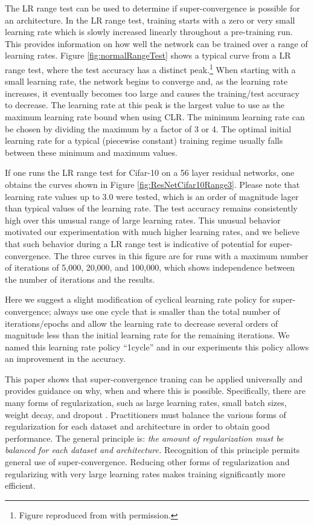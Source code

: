 \documentclass{article}
\begin{document}
The LR range test  can be used to determine if super-convergence is possible for an architecture.
In the LR range test, training starts with a zero or very small learning rate which is slowly increased linearly throughout a  pre-training run.  
This provides information on how well the network can be trained over a range of learning rates.
Figure \ref{fig:normalRangeTest} shows a typical curve from a LR range test, where the test accuracy has a distinct peak.\footnote{Figure reproduced from \citet{smith2017cyclical} with permission.}
When starting with a small learning rate, the network begins to converge and, as the learning rate increases, it eventually becomes too large and causes the training/test accuracy to decrease.
The learning rate at this peak is the largest value to use as the maximum learning rate bound when using CLR.
The minimum learning rate can be  chosen by dividing the maximum by a factor of 3 or 4.
The optimal initial learning rate for a typical (piecewise constant) training regime usually falls between these minimum and maximum values. 

If one runs the LR range test for Cifar-10 on a 56 layer residual networks, one obtains the curves shown in Figure \ref{fig:ResNetCifar10Range3}.
Please note that learning rate values up to 3.0 were tested, which is an order of magnitude lager than typical values of the learning rate.
The test accuracy remains consistently high over this unusual range of large learning rates. 
This unusual behavior motivated our experimentation with much higher learning rates, and we believe that such behavior during a LR range test is indicative of potential for super-convergence.
The three curves in this figure are for runs with a maximum number of iterations of 5,000, 20,000, and 100,000, which shows independence between the number of iterations and the results. 

Here we suggest a slight modification of cyclical learning rate policy for super-convergence; always use one cycle that is smaller than the total number of iterations/epochs and allow the learning rate to decrease several orders of magnitude less than the initial learning rate for the remaining iterations.  We named this learning rate policy ``1cycle'' and in our experiments this policy allows an improvement in the accuracy.  

This paper shows that super-convergence traning can be applied universally and provides guidance on why, when and where this is possible. Specifically, there are many forms of regularization, such as large learning rates, small batch sizes, weight decay, and dropout \citep{srivastava2014dropout}.  Practitioners must balance the various forms of regularization for each dataset and architecture in order to obtain good performance.  
The general principle is: \emph{the amount of regularization must be balanced for each dataset and architecture.}  Recognition of this principle permits general use of super-convergence.  Reducing other forms of regularization and regularizing with very large learning rates makes training significantly more efficient.  
\end{document}
